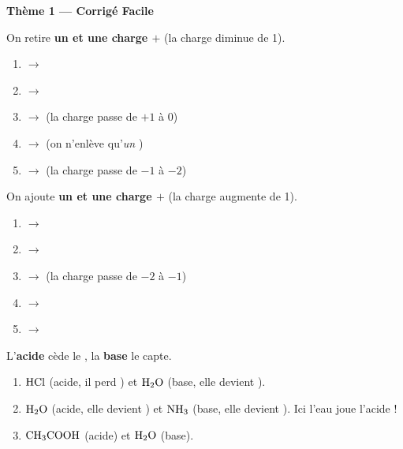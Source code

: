 \documentclass[11pt,a4paper]{article}
\begin{document}
\begin{center}
{\LARGE\bfseries\color{primarydark} Thème 1 --- Corrigé Facile}
\end{center}

\begin{corrbox}
On retire \textbf{un  et une charge $+$} (la charge diminue de 1).
\begin{enumerate}[label=\alph*),leftmargin=1.6em,itemsep=1pt]
  \item {} $\to$ 
  \item {} $\to$ 
  \item {} $\to$  \quad(la charge passe de $+1$ à $0$)
  \item {} $\to$  \quad(on n'enlève qu'\emph{un} )
  \item {} $\to$  \quad(la charge passe de $-1$ à $-2$)
\end{enumerate}
\end{corrbox}

\begin{corrbox}
On ajoute \textbf{un  et une charge $+$} (la charge augmente de 1).
\begin{enumerate}[label=\alph*),leftmargin=1.6em,itemsep=1pt]
  \item {} $\to$ 
  \item {} $\to$ 
  \item {} $\to$  \quad(la charge passe de $-2$ à $-1$)
  \item {} $\to$ 
  \item {} $\to$ 
\end{enumerate}
\end{corrbox}

\begin{corrbox}
L'\textcolor{acidecol}{\textbf{acide}} cède le , la \textcolor{basecol}{\textbf{base}} le capte.
\begin{enumerate}[label=\alph*),leftmargin=1.6em,itemsep=2pt]
  \item $\ce{HCl}$ (\textcolor{acidecol}{acide}, il perd ) et $\ce{H2O}$ (\textcolor{basecol}{base},
        elle devient ).
  \item $\ce{H2O}$ (\textcolor{acidecol}{acide}, elle devient ) et $\ce{NH3}$
        (\textcolor{basecol}{base}, elle devient ). Ici l'eau joue l'acide !
  \item $\ce{CH3COOH}$ (\textcolor{acidecol}{acide}) et $\ce{H2O}$ (\textcolor{basecol}{base}).
\end{enumerate}
\end{corrbox}
\end{document}

